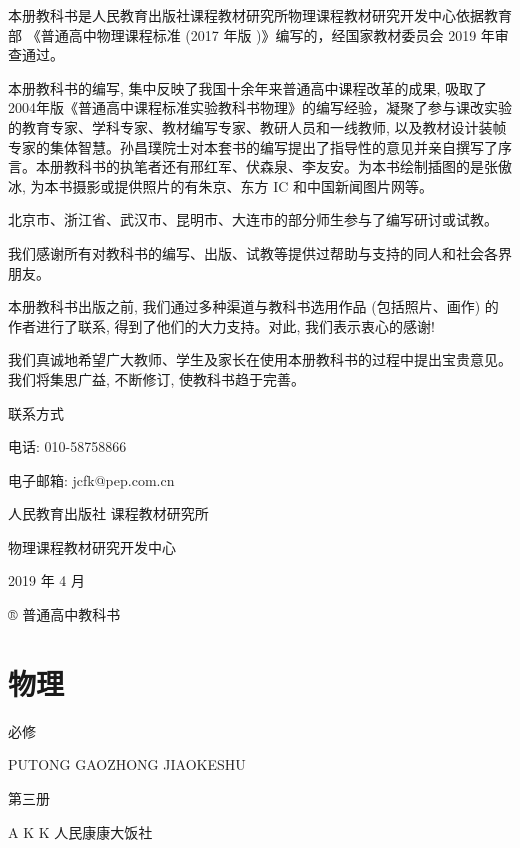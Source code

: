 \documentclass[10pt]{article}
\begin{document}
本册教科书是人民教育出版社课程教材研究所物理课程教材研究开发中心依据教育部 《普通高中物理课程标准 (2017 年版 )》编写的，经国家教材委员会 2019 年审查通过。

本册教科书的编写, 集中反映了我国十余年来普通高中课程改革的成果, 吸取了 2004年版《普通高中课程标准实验教科书物理》的编写经验，凝聚了参与课改实验的教育专家、学科专家、教材编写专家、教研人员和一线教师, 以及教材设计装帧专家的集体智慧。孙昌璞院士对本套书的编写提出了指导性的意见并亲自撰写了序言。本册教科书的执笔者还有邢红军、伏森泉、李友安。为本书绘制插图的是张傲冰, 为本书摄影或提供照片的有朱京、东方 IC 和中国新闻图片网等。

北京市、浙江省、武汉市、昆明市、大连市的部分师生参与了编写研讨或试教。

我们感谢所有对教科书的编写、出版、试教等提供过帮助与支持的同人和社会各界朋友。

本册教科书出版之前, 我们通过多种渠道与教科书选用作品 (包括照片、画作) 的作者进行了联系, 得到了他们的大力支持。对此, 我们表示衷心的感谢!

我们真诚地希望广大教师、学生及家长在使用本册教科书的过程中提出宝贵意见。我们将集思广益, 不断修订, 使教科书趋于完善。

联系方式

电话: 010-58758866

电子邮箱: jcfk@pep.com.cn

人民教育出版社 课程教材研究所

物理课程教材研究开发中心

2019 年 4 月

® 普通高中教科书

\section*{物理}

必修

PUTONG GAOZHONG JIAOKESHU

第三册

A K K 人民康康大饭社
\end{document}

